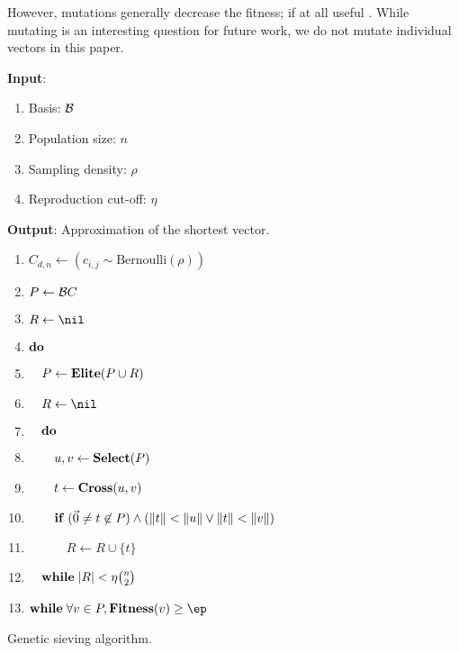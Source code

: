 \documentclass{homework}
\begin{document}
However, mutations generally decrease the fitness; if at all useful
\cite{DBLP:journals/corr/abs-1907-04629}. While mutating is an
interesting question for future work, we do not mutate individual
vectors in this paper.

\begin{algorithm}
  \begin{flushleft}
    \noindent\textbf{Input}:
    \begin{enumerate}
      \item Basis: $\mathcal{B}$
      \item Population size: $n$
      \item Sampling density: $\rho$
      \item Reproduction cut-off: $\eta$
    \end{enumerate}
    \noindent\textbf{Output}: Approximation of the shortest vector.
  \end{flushleft}
  \begin{enumerate}[label=\arabic*:]
    \item $C_{d,n} \leftarrow (c_{i,j} \sim \text{Bernoulli}(\rho))$
    \item $P \leftarrow \mathcal{B} C$
    \item $R \leftarrow \nil$
    \item $\mathbf{do\;}$
    \item $\quad P \leftarrow \mathbf{Elite}(P \cup R)$
    \item $\quad R \leftarrow \nil$
    \item $\quad \mathbf{do\;}$
    \item $\quad\quad u, v \leftarrow \mathbf{Select}(P)$
    \item $\quad\quad t \leftarrow \mathbf{Cross}(u, v)$
    \item $\quad\quad \mathbf{if\;} (\vec{0} \neq t \not\in P) \wedge
    (\left\lVert t\right\rVert < \left\lVert u\right\rVert \vee \left\lVert t\right\rVert < \left\lVert v\right\rVert)$
    \item $\quad\quad\quad R \leftarrow R \cup \{t\}$
    \item $\quad \mathbf{while\;} |R| < \eta \binom{n}{2}$
    \item $\WHILE \forall v \in P, \FIT(v) \geq \ep$
  \end{enumerate}
  \caption{Genetic sieving algorithm.}
  \label{gas}
\end{algorithm}


\newpage


\end{document}

